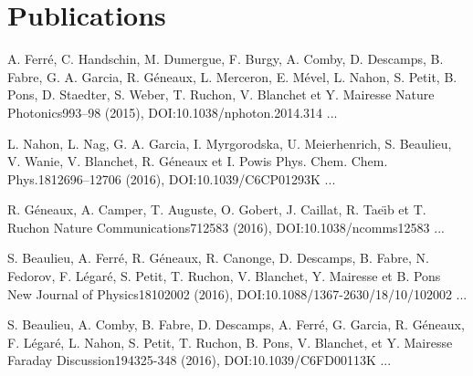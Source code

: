 \part*{Publications}




{A. Ferré, C. Handschin, M. Dumergue, F. Burgy, A. Comby, D. Descamps, B. Fabre, G. A. Garcia, R. Géneaux, L. Merceron, E. Mével, L. Nahon, S. Petit, B. Pons, D. Staedter, S. Weber, T. Ruchon, V. Blanchet et Y. Mairesse} 
{Nature Photonics}{9}{93–98 (2015), DOI:10.1038/nphoton.2014.314}
{...}
\par\noindent

{L. Nahon, L. Nag, G. A. Garcia, I. Myrgorodska, U. Meierhenrich, S. Beaulieu, V. Wanie, V. Blanchet, R. Géneaux et I. Powis} 
{Phys. Chem. Chem. Phys.}{18}{12696–12706 (2016), DOI:10.1039/C6CP01293K}
{...}
\par\noindent

{R. G\'eneaux, A. Camper, T. Auguste, O. Gobert, J. Caillat, R. Tae{\"\i}b et T. Ruchon} 
{Nature Communications}{7}{12583 (2016), DOI:10.1038/ncomms12583}
{...}
\par\noindent

{S. Beaulieu, A. Ferré, R. Géneaux, R. Canonge, D. Descamps, B. Fabre, N. Fedorov, F. Légaré, S. Petit, T. Ruchon, V. Blanchet, Y. Mairesse et B. Pons} 
{New Journal of Physics}{18}{102002 (2016), DOI:10.1088/1367-2630/18/10/102002}
{...}
\par\noindent

{S. Beaulieu, A. Comby, B. Fabre, D. Descamps, A. Ferré, G. Garcia, R. Géneaux, F. Légaré, L. Nahon, S. Petit, T. Ruchon, B. Pons, V. Blanchet, et Y. Mairesse} 
{Faraday Discussion}{194}{325-348 (2016), DOI:10.1039/C6FD00113K}
{...}
\par\noindent